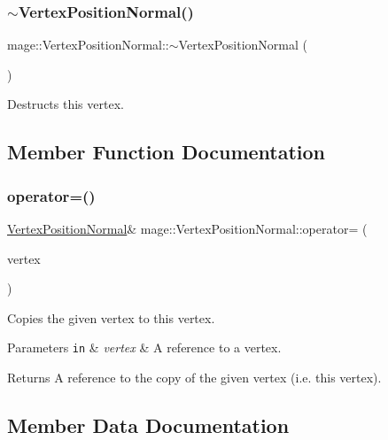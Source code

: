 \subsubsection{\texorpdfstring{$\sim$\+Vertex\+Position\+Normal()}{~VertexPositionNormal()}}
{\footnotesize\ttfamily mage\+::\+Vertex\+Position\+Normal\+::$\sim$\+Vertex\+Position\+Normal (\begin{DoxyParamCaption}{ }\end{DoxyParamCaption})\hspace{0.3cm}{\ttfamily [default]}}

Destructs this vertex. 

\subsection{Member Function Documentation}
\hypertarget{structmage_1_1_vertex_position_normal_a43c666c745b5807afddf87049ace0ef1}{}\label{structmage_1_1_vertex_position_normal_a43c666c745b5807afddf87049ace0ef1} 
\subsubsection{\texorpdfstring{operator=()}{operator=()}}
{\footnotesize\ttfamily \hyperlink{structmage_1_1_vertex_position_normal}{Vertex\+Position\+Normal}\& mage\+::\+Vertex\+Position\+Normal\+::operator= (\begin{DoxyParamCaption}\item[{const \hyperlink{structmage_1_1_vertex_position_normal}{Vertex\+Position\+Normal} \&}]{vertex }\end{DoxyParamCaption})\hspace{0.3cm}{\ttfamily [default]}}

Copies the given vertex to this vertex.


\begin{DoxyParams}[1]{Parameters}
\mbox{\tt in}  & {\em vertex} & A reference to a vertex. \\
\hline
\end{DoxyParams}
\begin{DoxyReturn}{Returns}
A reference to the copy of the given vertex (i.\+e. this vertex). 
\end{DoxyReturn}


\subsection{Member Data Documentation}
\hypertarget{structmage_1_1_vertex_position_normal_ab4765069df93930c4fecc0029503061e}{}\label{structmage_1_1_vertex_position_normal_ab4765069df93930c4fecc0029503061e} 
